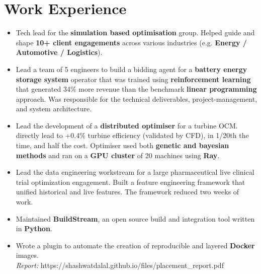 \documentclass[a4paper]{deedy-resume} %
\begin{document}
\section{Work Experience}
\begin{itemize}
    \item Tech lead for the \textbf{simulation based optimisation} group. Helped guide and shape \textbf{10+ client engagements} across various industries (e.g. \textbf{Energy / Automotive / Logistics}). 
    \item Lead a team of 5 engineers to build a bidding agent for a \textbf{battery energy storage system} operator that was trained using \textbf{reinforcement learning} that generated 34\% more revenue than the benchmark \textbf{linear programming} approach. Was responsible for the technical deliverables, project-management, and system architecture.
    \item Lead the development of a \textbf{distributed optimiser} for a turbine OCM. directly lead to +0.4\% turbine efficiency (validated by CFD), in 1/20th the time, and half the cost. Optimiser used both \textbf{genetic and bayesian methods} and ran on a \textbf{GPU cluster} of 20 machines using \textbf{Ray}. 
    \item Lead the data engineering workstream for a large pharmaceutical live clinical trial optimization engagement. Built a feature engineering framework that unified historical and live features. The framework reduced two weeks of work.
\end{itemize} 
\begin{itemize}
    \item Maintained \textbf{BuildStream}, an open source build and integration tool written in \textbf{Python}.
    \item Wrote a plugin to automate the creation of reproducible and layered \textbf{Docker} images.
    \\
    \textit{Report:} https://shashwatdalal.github.io/files/placement\_report.pdf \\
\end{itemize}
\end{document}
